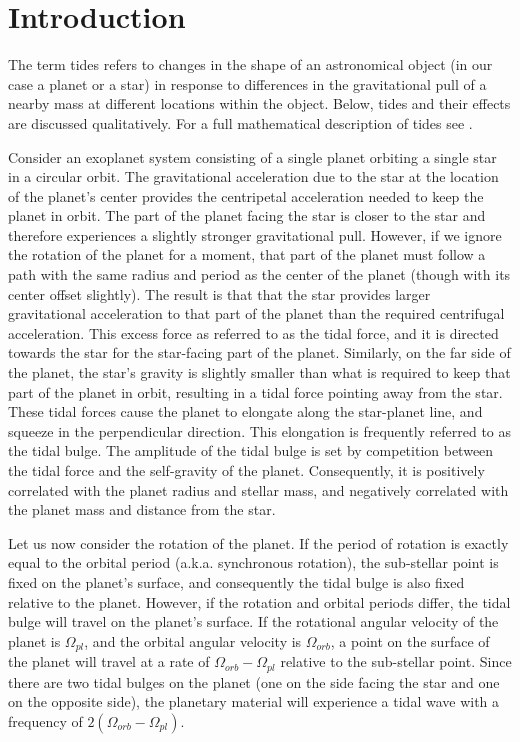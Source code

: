 \section{Introduction}
%
\label{sec:introduction}

The term tides refers to changes in the shape of an astronomical object (in our
case a planet or a star) in response to differences in the gravitational pull of
a nearby mass at different locations within the object. Below, tides and their
effects are discussed qualitatively. For a full mathematical description of
tides see \cite{Murray_Dermott_book}.

Consider an exoplanet system consisting of a single planet orbiting a single
star in a circular orbit. The gravitational acceleration due to the star at the
location of the planet's center provides the centripetal acceleration needed to
keep the planet in orbit. The part of the planet facing the star is closer to
the star and therefore experiences a slightly stronger gravitational pull.
However, if we ignore the rotation of the planet for a moment, that part of the
planet must follow a path with the same radius and period as the center of the
planet (though with its center offset slightly). The result is that that the
star provides larger gravitational acceleration to that part of the planet than
the required centrifugal acceleration. This excess force as referred to as the
tidal force, and it is directed towards the star for the star-facing part of the
planet. Similarly, on the far side of the planet, the star's gravity is slightly
smaller than what is required to keep that part of the planet in orbit,
resulting in a tidal force pointing away from the star. These tidal forces cause
the planet to elongate along the star-planet line, and squeeze in the
perpendicular direction. This elongation is frequently referred to as the tidal
bulge. The amplitude of the tidal bulge is set by competition between the tidal
force and the self-gravity of the planet. Consequently, it is positively
correlated with the planet radius and stellar mass, and negatively correlated
with the planet mass and distance from the star.

Let us now consider the rotation of the planet. If the period of rotation is
exactly equal to the orbital period (a.k.a. synchronous rotation), the
sub-stellar point is fixed on the planet's surface, and consequently the tidal
bulge is also fixed relative to the planet. However, if the rotation and orbital
periods differ, the tidal bulge will travel on the planet's surface. If the
rotational angular velocity of the planet is $\Omega_{pl}$, and the orbital
angular velocity is $\Omega_{orb}$, a point on the surface of the planet will
travel at a rate of $\Omega_{orb} - \Omega_{pl}$ relative to the sub-stellar
point. Since there are two tidal bulges on the planet (one on the side facing
the star and one on the opposite side), the planetary material will experience a
tidal wave with a frequency of $2(\Omega_{orb} - \Omega_{pl})$.

